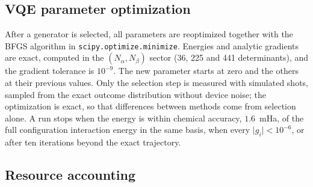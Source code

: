 \documentclass[aps,pra,reprint,superscriptaddress,nofootinbib]{revtex4-2}
\begin{document}
\subsection{VQE parameter optimization}

After a generator is selected, all parameters are reoptimized together with the BFGS algorithm in \texttt{scipy.optimize.minimize}. Energies and analytic gradients are exact, computed in the $(N_\alpha,N_\beta)$ sector (36, 225 and 441 determinants), and the gradient tolerance is $10^{-9}$. The new parameter starts at zero and the others at their previous values. Only the selection step is measured with simulated shots, sampled from the exact outcome distribution without device noise; the optimization is exact, so that differences between methods come from selection alone. A run stops when the energy is within chemical accuracy, $1.6$~mHa, of the full configuration interaction energy in the same basis, when every $\lvert g_i\rvert<10^{-6}$, or after ten iterations beyond the exact trajectory.

\subsection{Resource accounting}
\label{sec:resources}
\end{document}
